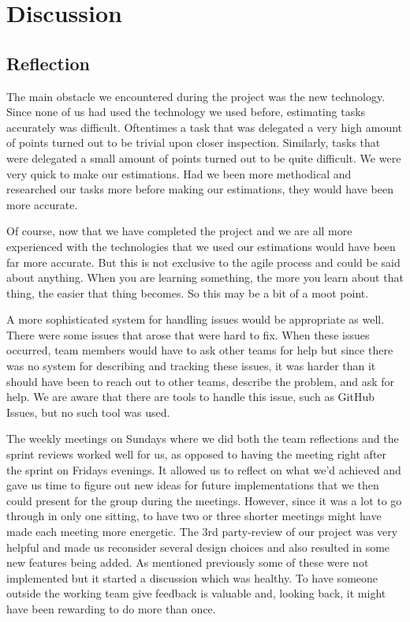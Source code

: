 \section{Discussion}
\subsection{Reflection}
The main obstacle we encountered during the project was the new technology. Since none of us had used the technology we used before, estimating tasks accurately was difficult. Oftentimes a task that was delegated a very high amount of points turned out to be trivial upon closer inspection. Similarly, tasks that were delegated a small amount of points turned out to be quite difficult. We were very quick to make our estimations. Had we been more methodical and researched our tasks more before making our estimations, they would have been more accurate. 

Of course, now that we have completed the project and we are all more experienced with the technologies that we used our estimations would have been far more accurate. But this is not exclusive to the agile process and could be said about anything. When you are learning something, the more you learn about that thing, the easier that thing becomes. So this may be a bit of a moot point. 

A more sophisticated system for handling issues would be appropriate as well. There were some issues that arose that were hard to fix. When these issues occurred, team members would have to ask other teams for help but since there was no system for describing and tracking these issues, it was harder than it should have been to reach out to other teams, describe the problem, and ask for help. We are aware that there are tools to handle this issue, such as GitHub Issues, but no such tool was used. 

The weekly meetings on Sundays where we did both the team reflections and the sprint reviews worked well for us, as opposed to having the meeting right after the sprint on Fridays evenings. It allowed us to reflect on what we’d achieved and gave us time to figure out new ideas for future implementations that we then could present for the group during the meetings. However, since it was a lot to go through in only one sitting, to have two or three shorter meetings might have made each meeting more energetic. The 3rd party-review of our project was very helpful and made us reconsider several design choices and also resulted in some new features being added. As mentioned previously some of these were not implemented but it started a discussion which was healthy. To have someone outside the working team give feedback is valuable and, looking back, it might have been rewarding to do more than once.

